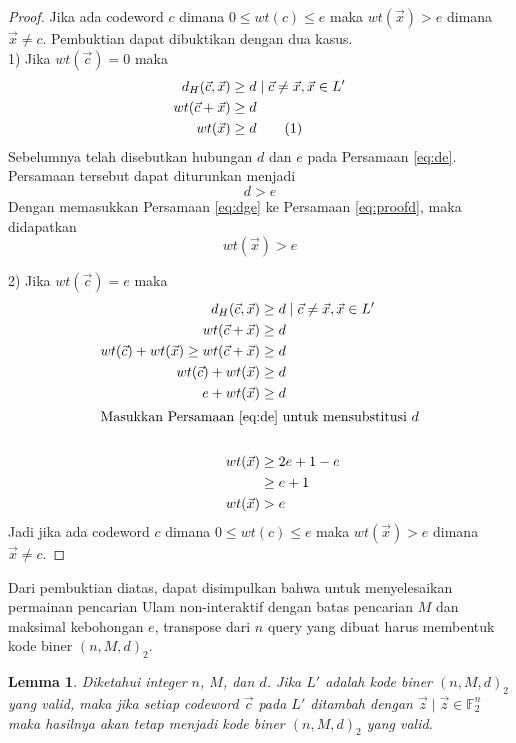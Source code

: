 \documentclass[conference,compsoc]{IEEEtran}
\newtheorem{lemma}[theorem]{Lemma}
\newcommand{\refeq}[1]{Persamaan \ref{#1}}
\begin{document}
\begin{proof}
Jika ada codeword $c$ dimana $0 \le wt(c) \le e$ maka $wt(\vec{x}) > e$ dimana $\vec{x} \neq c$. Pembuktian dapat dibuktikan dengan dua kasus.\\

1) Jika $wt(\vec{c}) = 0$ maka
\begin{align*}
d_H(\vec{c},\vec{x}) &\ge d \mid \vec{c} \neq \vec{x} , \vec{x} \in L' \\
wt(\vec{c} + \vec{x}) &\ge d \\
wt(\vec{x}) &\ge d \label{eq:proofd} \stepcounter{equation} \tag{\theequation}
\end{align*}
Sebelumnya telah disebutkan hubungan $d$ dan $e$ pada \refeq{eq:de}. Persamaan tersebut dapat diturunkan menjadi
\begin{equation} \label{eq:dge}
d > e
\end{equation}
Dengan memasukkan \refeq{eq:dge} ke \refeq{eq:proofd}, maka didapatkan
\begin{equation*}
wt(\vec{x}) > e
\end{equation*}

2) Jika $wt(\vec{c}) = e$ maka
\begin{align*}
d_H(\vec{c},\vec{x}) &\ge d \mid \vec{c} \neq \vec{x} , \vec{x} \in L' \\
wt(\vec{c}+\vec{x}) &\ge d \\
wt(\vec{c}) + wt(\vec{x}) \ge wt(\vec{c}+\vec{x}) &\ge d \\
wt(\vec{c}) + wt(\vec{x}) &\ge d \\
e + wt(\vec{x}) &\ge d \\
\intertext{Masukkan \refeq{eq:de} untuk mensubstitusi $d$}\\
wt(\vec{x}) &\ge 2e+1-e \\
&\ge e+1\\
wt(\vec{x}) &> e
\end{align*}
Jadi jika ada codeword $c$ dimana $0 \le wt(c) \le e$ maka $wt(\vec{x}) > e$ dimana $\vec{x} \neq c$.
\end{proof}

Dari pembuktian diatas, dapat disimpulkan bahwa untuk menyelesaikan permainan pencarian Ulam non-interaktif dengan batas pencarian $M$ dan maksimal kebohongan $e$, transpose dari $n$ query yang dibuat harus membentuk kode biner $(n,M,d)_2$.

\begin{lemma}
Diketahui integer $n$, $M$, dan $d$. Jika $L'$ adalah kode biner $(n,M,d)_2$ yang valid, maka jika setiap codeword $\vec{c}$ pada $L'$ ditambah dengan $\vec{z} \mid \vec{z} \in \mathbb{F}_2^n$ maka hasilnya akan tetap menjadi kode biner $(n,M,d)_2$ yang valid.
\end{lemma}
\end{document}
